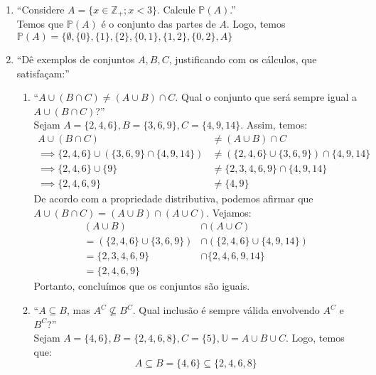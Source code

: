 \documentclass[13pt,letterpaper]{article}
\begin{document}
\begin{enumerate}
\begin{enumerate}
\begin{itemize}
        \end{itemize}
    \end{enumerate}
    \item \enquote{Considere $A = \{ x \in \mathbb{Z}_+ ; x < 3 \}$. Calcule $\mathbb{P}(A)$.} \\
    Temos que $\mathbb{P}(A)$ é o conjunto das partes de $A$. Logo, temos $\mathbb{P}(A) = \{\emptyset, \{0\}, \{1\}, \{2\}, \{0, 1\}, \{1, 2\}, \{0, 2\}, A \}$
    \item \enquote{Dê exemplos de conjuntos $A, B, C$, justificando com os cálculos, que satisfaçam:}
    \begin{enumerate}
        \item \enquote{$A \cup (B \cap C) \ne (A \cup B) \cap C$. Qual o conjunto que será sempre igual a $A \cup (B \cap C)$?} \\
        Sejam $A = \{ 2, 4, 6 \}, B = \{3, 6, 9 \}, C = \{4, 9, 14\}$. Assim, temos: 
        \begin{align*}
        A \cup (B \cap C) &\ne (A \cup B) \cap C \\ \implies
            \{ 2, 4, 6 \} \cup (\{3, 6, 9 \} \cap \{4, 9, 14\}) &\ne (\{ 2, 4, 6 \} \cup \{3, 6, 9 \}) \cap \{4, 9, 14\} \\
            \implies
            \{2, 4, 6\} \cup \{9\} &\ne \{2, 3, 4, 6, 9\} \cap \{4, 9, 14\} \\
            \implies
            \{2, 4, 6, 9\} &\ne \{4, 9\}
        \end{align*}
        De acordo com a propriedade distributiva, podemos afirmar que $A \cup (B \cap C) = (A \cup B) \cap (A \cup C)$. Vejamos:
        \begin{align*}
            (A \cup B) &\cap (A \cup C) \\ =
            (\{ 2, 4, 6 \} \cup \{3, 6, 9 \}) &\cap (\{ 2, 4, 6 \} \cup \{4, 9, 14\}) \\ =
            \{ 2, 3, 4, 6, 9\} &\cap \{2, 4, 6, 9, 14 \} \\ = \{ 2, 4, 6, 9\}
        \end{align*}
        Portanto, concluímos que os conjuntos são iguais.
        \item \enquote{$A \subseteq B$, mas $A^C \nsubseteq B^C$. Qual inclusão é sempre válida envolvendo $A^C$ e $B^C$?} \\
        Sejam $A = \{4, 6\}, B = \{2, 4, 6, 8 \}, C = \{5\}, \mathbb{U} = A \cup B \cup C$. Logo, temos que:
        \begin{displaymath}
            A \subseteq B = \{4, 6\} \subseteq \{2, 4, 6, 8\}

\end{displaymath}
\end{enumerate}
\end{enumerate}
\end{document}
